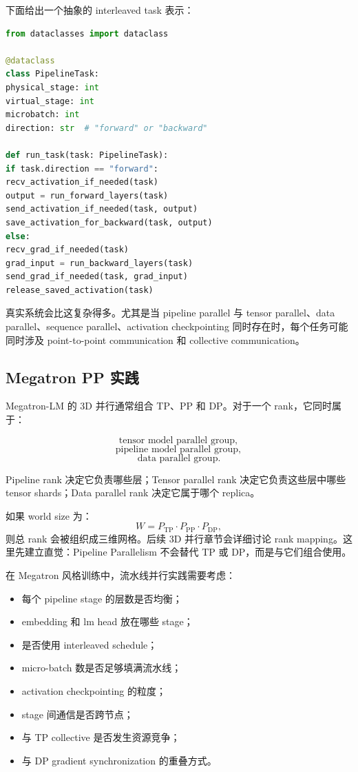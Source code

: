 下面给出一个抽象的 interleaved task 表示：

\begin{lstlisting}[language=Python,caption={Interleaved Pipeline 中任务描述的抽象表示},label={lst:interleaved-task-abstraction}]
from dataclasses import dataclass

@dataclass
class PipelineTask:
physical_stage: int
virtual_stage: int
microbatch: int
direction: str  # "forward" or "backward"

def run_task(task: PipelineTask):
if task.direction == "forward":
recv_activation_if_needed(task)
output = run_forward_layers(task)
send_activation_if_needed(task, output)
save_activation_for_backward(task, output)
else:
recv_grad_if_needed(task)
grad_input = run_backward_layers(task)
send_grad_if_needed(task, grad_input)
release_saved_activation(task)
\end{lstlisting}

真实系统会比这复杂得多。尤其是当 pipeline parallel 与 tensor parallel、data parallel、sequence parallel、activation checkpointing 同时存在时，每个任务可能同时涉及 point-to-point communication 和 collective communication。

\subsection{Megatron PP 实践}
\label{subsec:megatron-pipeline-practice}

Megatron-LM 的 3D 并行通常组合 TP、PP 和 DP。对于一个 rank，它同时属于：

\[
\text{tensor model parallel group},
\]
\[
\text{pipeline model parallel group},
\]
\[
\text{data parallel group}.
\]

Pipeline rank 决定它负责哪些层；Tensor parallel rank 决定它负责这些层中哪些 tensor shards；Data parallel rank 决定它属于哪个 replica。

如果 world size 为：
\[
W=P_{\mathrm{TP}}\cdot P_{\mathrm{PP}}\cdot P_{\mathrm{DP}},
\]
则总 rank 会被组织成三维网格。后续 3D 并行章节会详细讨论 rank mapping。这里先建立直觉：Pipeline Parallelism 不会替代 TP 或 DP，而是与它们组合使用。

在 Megatron 风格训练中，流水线并行实践需要考虑：

\begin{itemize}
\item 每个 pipeline stage 的层数是否均衡；
\item embedding 和 lm head 放在哪些 stage；
\item 是否使用 interleaved schedule；
\item micro-batch 数是否足够填满流水线；
\item activation checkpointing 的粒度；
\item stage 间通信是否跨节点；
\item 与 TP collective 是否发生资源竞争；
\item 与 DP gradient synchronization 的重叠方式。
\end{itemize}


